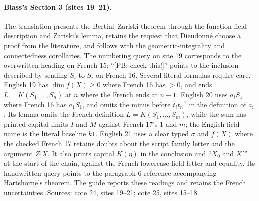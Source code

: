 \paragraph{Blass's Section 3 (sites 19--21).}
The translation presents the Bertini--Zariski theorem through the function-field description and Zariski's lemma, retains the request that Dieudonné choose a proof from the literature, and follows with the geometric-integrality and connectedness corollaries. The numbering query on site 19 corresponds to the overwritten heading on French 15; ``[PB: check this!]'' points to the inclusion described by sending $S_i$ to $S_i$ on French 16. Several literal formulas require care. English 19 has $\dim\overline{f(X)}\geq0$ where French 16 has $>0$, and ends $L=K(S_1,\ldots,S_n)$ at $n$ where the French ends at $n-1$. English 20 uses $a_iS_1$ where French 16 has $a_1S_1$, and omits the minus before $t_it_n^{-1}$ in the definition of $a_i$. Its lemma omits the French definition $L=K(S_1,\ldots,S_m)$, while the sum has printed capital limits $I$ and $M$ against French 17's $1$ and $m$; the English field name is the literal baseline $k1$. English 21 uses a clear typed $\sigma$ and $f(X)$ where the checked French 17 retains doubts about the script family letter and the argument $Z|X$. It also prints capital $K(\eta)$ in the conclusion and ``$X_0$ and $X'$'' at the start of the chain, against the French lowercase field letter and equality. Its handwritten query points to the paragraph-6 reference accompanying Hartshorne's theorem. The guide reports these readings and retains the French uncertainties. Sources: \href{https://grothendieck.umontpellier.fr/web/viewer.html?file=../24.pdf\#page=20}{cote 24, sites 19--21}; \href{https://grothendieck.umontpellier.fr/web/viewer.html?file=../25.pdf\#page=16}{cote 25, sites 15--18}.

